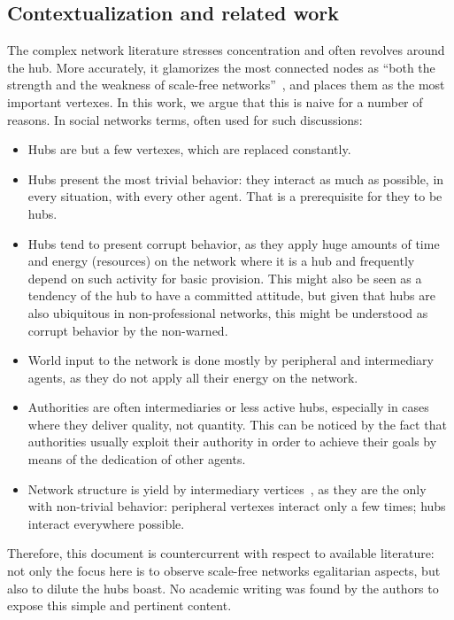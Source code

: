 \documentclass[12pt,fleqn]{article}
\begin{document}
\subsection{Contextualization and related work}\label{sec:rel}
The complex network literature stresses concentration and often revolves around the hub. 
More accurately, it glamorizes the most connected nodes as
``both the strength and the weakness of scale-free networks''~\citep{wikipedia,networks},
and places them as the most important vertexes.
In this work, we argue that this is naive for a number of reasons.
In social networks terms, often used for such discussions:
\begin{itemize}
    \item Hubs are but a few vertexes, which are replaced constantly.
    \item Hubs present the most trivial behavior:
	    they interact as much as possible, in every situation, with every other agent.
		That is a prerequisite for they to be hubs.
    \item Hubs tend to present corrupt behavior,
	    as they apply huge amounts of time and energy (resources)
		on the network where it is a hub and frequently depend on such activity for basic provision.
		This might also be seen as a tendency of the hub to have a committed attitude,
		but given that hubs are also ubiquitous in non-professional networks,
		this might be understood as corrupt behavior by the non-warned.
    \item World input to the network is done mostly by peripheral and intermediary agents,
	    as they do not apply all their energy on the network.
    \item Authorities are often intermediaries or less active hubs,
	    especially in cases where they deliver quality, not quantity.
		This can be noticed by the fact that authorities usually exploit their authority
		in order to achieve their goals by means of the dedication of other agents.
	\item Network structure is yield by intermediary vertices~\citep{fabbri2},
	    as they are the only with non-trivial behavior:
		peripheral vertexes interact only a few times; hubs interact everywhere possible.
\end{itemize}

Therefore, this document is countercurrent with respect to available literature:
not only the focus here is to observe scale-free networks egalitarian aspects,
but also to dilute the hubs boast.
No academic writing was found by the authors to expose this simple and pertinent content.
\end{document}
